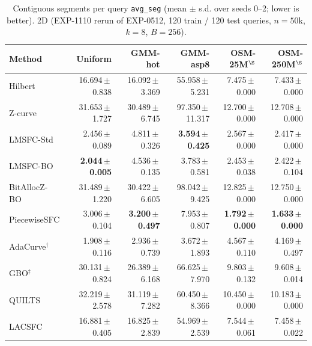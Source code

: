 \begin{table}[t]
\centering\small
\caption{Contiguous segments per query \texttt{avg\_seg} (mean $\pm$ s.d. over seeds 0--2; lower is better). 2D (EXP-1110 rerun of EXP-0512, 120 train / 120 test queries, $n=50$k, $k=8$, $B=256$).}
\label{tab:exp1110_2d_avg_seg}
\begin{tabular}{lrrrrr}
\toprule
Method & Uniform & GMM-hot & GMM-asp8 & OSM-25M$^\S$ & OSM-250M$^\S$ \\
\midrule
Hilbert & 16.694\,$\pm$\,0.838 & 16.092\,$\pm$\,3.369 & 55.958\,$\pm$\,5.231 & 7.475\,$\pm$\,0.000 & 7.433\,$\pm$\,0.000 \\
Z-curve & 31.653\,$\pm$\,1.727 & 30.489\,$\pm$\,6.745 & 97.350\,$\pm$\,11.317 & 12.700\,$\pm$\,0.000 & 12.708\,$\pm$\,0.000 \\
LMSFC-Std & 2.456\,$\pm$\,0.089 & 4.811\,$\pm$\,0.326 & \textbf{3.594\,$\pm$\,0.425} & 2.567\,$\pm$\,0.000 & 2.417\,$\pm$\,0.000 \\
LMSFC-BO & \textbf{2.044\,$\pm$\,0.005} & 4.536\,$\pm$\,0.135 & 3.783\,$\pm$\,0.581 & 2.453\,$\pm$\,0.038 & 2.422\,$\pm$\,0.104 \\
BitAllocZ-BO & 31.489\,$\pm$\,1.220 & 30.422\,$\pm$\,6.605 & 98.042\,$\pm$\,9.425 & 12.825\,$\pm$\,0.000 & 12.750\,$\pm$\,0.000 \\
PiecewiseSFC & 3.006\,$\pm$\,0.104 & \textbf{3.200\,$\pm$\,0.497} & 7.953\,$\pm$\,0.807 & \textbf{1.792\,$\pm$\,0.000} & \textbf{1.633\,$\pm$\,0.000} \\
AdaCurve$^\dagger$ & 1.908\,$\pm$\,0.116 & 2.936\,$\pm$\,0.739 & 3.672\,$\pm$\,1.893 & 4.567\,$\pm$\,0.110 & 4.169\,$\pm$\,0.497 \\
GBO$^\ddagger$ & 30.131\,$\pm$\,0.824 & 26.389\,$\pm$\,6.168 & 66.625\,$\pm$\,7.970 & 9.803\,$\pm$\,0.132 & 9.608\,$\pm$\,0.014 \\
QUILTS & 32.219\,$\pm$\,2.578 & 31.119\,$\pm$\,7.282 & 60.450\,$\pm$\,8.366 & 10.450\,$\pm$\,0.000 & 10.183\,$\pm$\,0.000 \\
LACSFC & 16.881\,$\pm$\,0.405 & 16.825\,$\pm$\,2.839 & 54.969\,$\pm$\,2.539 & 7.544\,$\pm$\,0.061 & 7.458\,$\pm$\,0.022 \\
\bottomrule
\end{tabular}
\end{table}

